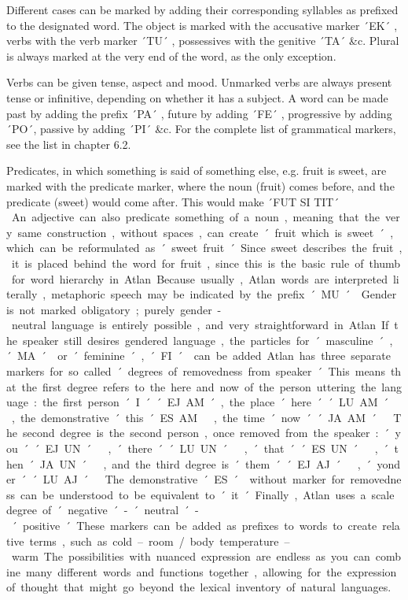 Different cases can be marked by adding their corresponding syllables as prefixed to the designated word. The object is marked with the accusative marker ´EK´ \ek, verbs with the verb marker ´TU´ \tu, possessives with the genitive ´TA´ \ta \&c. Plural is always marked at the very end of the word, as the only exception. 

Verbs can be given tense, aspect and mood. Unmarked verbs are always present tense or infinitive, depending on whether it has a subject. A word can be made past by adding the prefix ´PA´ \pa, future by adding ´FE´ \fe, progressive by adding ´PO´, passive by adding ´PI´ \&c. For the complete list of grammatical markers, see the list in chapter 6.2. 

Predicates, in which something is said of something else, e.g. fruit is sweet, are marked with the predicate marker, where the noun (fruit) comes before, and the predicate (sweet) would come after. This would make ´FUT SI TIT´ \fut  \si  \tit. An adjective can also predicate something of a noun, meaning that the very same construction, without spaces, can create ´fruit which is sweet´, which can be reformulated as ´sweet fruit´. Since sweet describes the fruit, it is placed behind the word for fruit, since this is the basic rule of thumb for word hierarchy in Atlan. 

Because usually, Atlan words are interpreted literally, metaphoric speech may be indicated by the prefix ´MU´ \Atlanmu. 

Gender is not marked obligatory; purely gender-neutral language is entirely possible, and very straightforward in Atlan. If the speaker still desires gendered language, the particles for ´masculine´, ´MA´ \ma or ´feminine´, ´FI´ \Atlanfi can be added. 

Atlan has three separate markers for so called ´degrees of removedness from speaker´. This means that the first degree refers to the here and now of the person uttering the language: the first person ´I´ ´EJ.AM´, the place ´here´ ´LU.AM´ \lu \am, the demonstrative ´this´ ES.AM \es \am, the time ´now´ ´JA.AM´ \ja \am. The second degree is the second person, once removed from the speaker: ´you´ ´EJ.UN´ \ej \un, ´there´ ´LU.UN´ \lu \un, ´that´ ´ES.UN´ \es \un, ´then´ JA.UN´ \ja \un, and the third degree is ´them´ ´EJ.AJ´ \ej \aj, ´yonder´ ´LU.AJ´ \lu \aj. The demonstrative ´ES´ \es without marker for removedness can be understood to be equivalent to ´it´.  

Finally, Atlan uses a scale degree of ´negative´ - ´neutral´ - ´positive´. These markers can be added as prefixes to words to create relative terms, such as cold – room / body temperature – warm. The possibilities with nuanced expression are endless as you can combine many different words and functions together, allowing for the expression of thought that might go beyond the lexical inventory of natural languages. 

